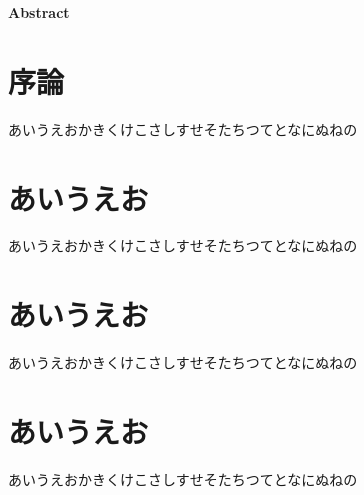 \documentclass[a4paper,10.5pt,dvipdfmx]{bxjsarticle}
\begin{document}
\thispagestyle{fancy}

\noindent
{}

\vspace{5mm}

\begin{center}
  \bfseries Abstract
\end{center}
\lipsum[1] %

\begin{multicols}{2}

\section{序論}
あいうえおかきくけこさしすせそたちつてとなにぬねの

\section{あいうえお\cite{lee2025bio}}
あいうえおかきくけこさしすせそたちつてとなにぬねの

\section{あいうえお}
あいうえおかきくけこさしすせそたちつてとなにぬねの

\section{あいうえお}
あいうえおかきくけこさしすせそたちつてとなにぬねの




\end{multicols}
\end{document}
